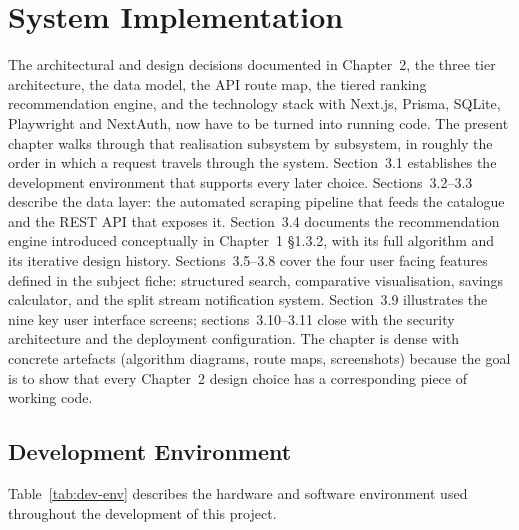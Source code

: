 
\chapter{System Implementation}

The architectural and design decisions documented in Chapter~2, the three tier architecture, the data model, the API route map, the tiered ranking recommendation engine, and the technology stack with Next.js, Prisma, SQLite, Playwright and NextAuth, now have to be turned into running code. The present chapter walks through that realisation subsystem by subsystem, in roughly the order in which a request travels through the system. Section~3.1 establishes the development environment that supports every later choice. Sections~3.2--3.3 describe the data layer: the automated scraping pipeline that feeds the catalogue and the REST API that exposes it. Section~3.4 documents the recommendation engine introduced conceptually in Chapter~1 §1.3.2, with its full algorithm and its iterative design history. Sections~3.5--3.8 cover the four user facing features defined in the subject fiche: structured search, comparative visualisation, savings calculator, and the split stream notification system. Section~3.9 illustrates the nine key user interface screens; sections~3.10--3.11 close with the security architecture and the deployment configuration. The chapter is dense with concrete artefacts (algorithm diagrams, route maps, screenshots) because the goal is to show that every Chapter~2 design choice has a corresponding piece of working code.

\section{Development Environment}

Table~\ref{tab:dev-env} describes the hardware and software environment used throughout the development of this project.

